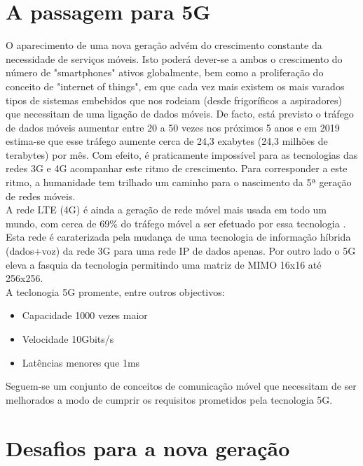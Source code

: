 \documentclass{llncs}
\begin{document}
\section{A passagem para 5G}
\hspace*{1.5em}O aparecimento de uma nova geração advém do crescimento constante da necessidade de serviços móveis. Isto poderá dever-se a ambos o crescimento do número de "smartphones" ativos globalmente, bem como a proliferação do conceito de "internet of things", em que cada vez mais existem os mais varados tipos de sistemas embebidos que nos rodeiam (desde frigoríficos a aspiradores) que necessitam de uma ligação de dados móveis. De facto, está previsto o tráfego de dados móveis aumentar entre 20 a 50 vezes nos próximos 5 anos e em 2019 estima-se que esse tráfego aumente cerca de 24,3 exabytes (24,3 milhões de terabytes) por mês. \cite{Fei} Com efeito, é praticamente impossível para as tecnologias das redes 3G e 4G acompanhar este ritmo de crescimento. Para corresponder a este ritmo, a humanidade tem trilhado um caminho para o nascimento da 5ª geração de redes móveis.
\\
\hspace*{1.5em}A rede LTE (4G) é ainda a geração de rede móvel mais usada em todo um mundo, com cerca de 69\% do tráfego móvel a ser efetuado por essa tecnologia \cite{cisco}. Esta rede é caraterizada pela mudança de uma tecnologia de informação híbrida (dados+voz) da rede 3G para uma rede IP de dados apenas.
Por outro lado o 5G eleva a fasquia da tecnologia permitindo uma matriz de MIMO 16x16 até 256x256. \\
A teclonogia 5G promente, entre outros objectivos:
\begin{itemize}
    \item Capacidade 1000 vezes maior
    \item Velocidade 10Gbits/s
    \item Latências menores que 1ms
\end{itemize}
Seguem-se um conjunto de conceitos de comunicação móvel que necessitam de ser melhorados a modo de cumprir os requisitos prometidos pela tecnologia 5G. \\
\section{Desafios para a nova geração}
\end{document}
